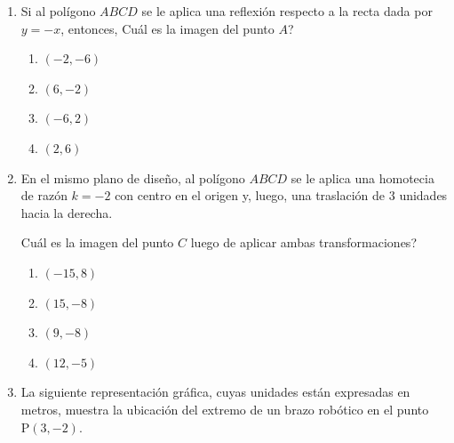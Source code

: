 \documentclass[12pt]{article}
\begin{document}
\begin{enumerate}[label=\textbf{\arabic*.}, itemsep=2.5cm]
\item
Si al pol\'igono $ABCD$ se le aplica una reflexi\'on respecto a la recta dada por $y=-x$, entonces, \textquestiondown Cu\'al es la imagen del punto $A$?

\begin{enumerate}[label=\Alph*)]
  \item $(-2,-6)$
  \item $(6,-2)$
  \item $(-6,2)$
  \item $(2,6)$
\end{enumerate}

\item
En el mismo plano de dise\~no, al pol\'igono $ABCD$ se le aplica una homotecia de raz\'on $k=-2$ con centro en el origen y, luego, una traslaci\'on de $3$ unidades hacia la derecha.

\textquestiondown Cu\'al es la imagen del punto $C$ luego de aplicar ambas transformaciones?

\begin{enumerate}[label=\Alph*)]
  \item $(-15,8)$
  \item $(15,-8)$
  \item $(9,-8)$
  \item $(12,-5)$
\end{enumerate}

\Needspace{0.98\textheight}
\item
La siguiente representaci\'on gr\'afica, cuyas unidades est\'an expresadas en metros, muestra la ubicaci\'on del extremo de un brazo rob\'otico en el punto $\mathrm{P}(3,-2)$.

\begin{center}
\end{center}


\end{enumerate}
\end{document}
